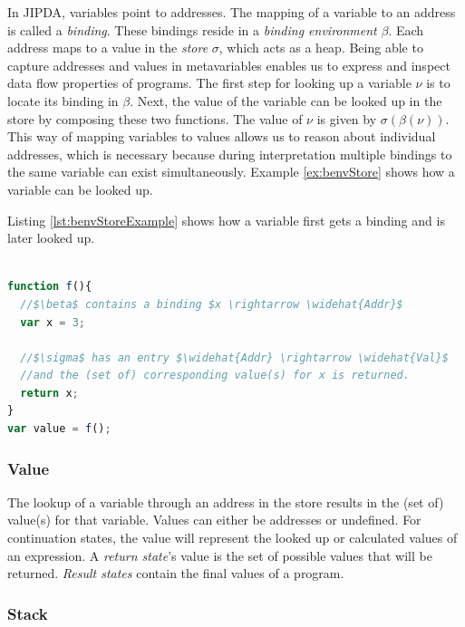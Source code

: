 In JIPDA, variables point to addresses. The mapping of a variable to an address is called a \textit{binding}. These bindings reside in a \textit{binding environment} $\beta$. Each address maps to a value in the \textit{store} $\sigma$, which acts as a heap. Being able to capture addresses and values in metavariables enables us to express and inspect data flow properties of programs. The first step for looking up a variable $\nu$ is to locate its binding in $\beta$. Next, the value of the variable can be looked up in the store by composing these two functions. The value of $\nu$ is given by $\sigma(\beta(\nu))$. This way of mapping variables to values allows us to reason about individual addresses, which is necessary because during interpretation multiple bindings to the same variable can exist simultaneously. Example \ref{ex:benvStore} shows how a variable can be looked up.
\begin{exmp}
Listing \ref{lst:benvStoreExample} shows how a variable first gets a binding and is later looked up.
\\
\begin{lstlisting}[label={lst:benvStoreExample},language=JavaScript,caption=Example of the binding environment and store workings, mathescape=true]  % float=t?

function f(){
  //$\beta$ contains a binding $x \rightarrow \widehat{Addr}$
  var x = 3; 
  
  //$\sigma$ has an entry $\widehat{Addr} \rightarrow \widehat{Val}$
  //and the (set of) corresponding value(s) for x is returned. 
  return x;
}
var value = f();
\end{lstlisting}
\end{exmp}


\subsubsection*{Value}
The lookup of a variable through an address in the store results in the (set of) value(s) for that variable. Values can either be addresses or undefined. For continuation states, the value will represent the looked up or calculated values of an expression. A \textit{return state}'s value is the set of possible values that will be returned. \textit{Result states} contain the final values of a program.

\subsubsection*{Stack}

